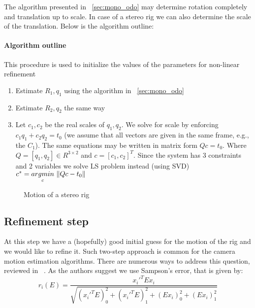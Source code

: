 \documentclass[10pt]{article}         %
\DeclarePairedDelimiter\norm{\lVert}{\rVert}%
\begin{document}
The algorithm presented in ~\ref{sec:mono_odo} may determine
rotation completely and translation up to scale.  In case of a stereo
rig we can also determine the scale of the translation.  Below is the
algorithm outline:

\paragraph{Algorithm outline} This procedure is used to initialize the
values of the parameters for non-linear refinement
\begin{enumerate}
\item Estimate $R_1,q_1$ using the algorithm in ~\ref{sec:mono_odo}
\item Estimate $R_2,q_2$ the same way
\item Let $c_1,c_2$ be the real scales of $q_1,q_2$. We solve for
  scale by enforcing $c_1q_1+c_2q_2 = t_0$ (we assume that all vectors
  are given in the same frame, e.g., the $C_1$).  The same equations
  may be written in matrix form $Qc=t_0$.  Where $Q = [q_1, q_2] \in
  R^{3\times2}$ and $c=[c_1,c_2]^T$.  Since the system has 3
  constraints and 2 variables we solve LS problem instead (using SVD)
  $c^* = \underset{c}{argmin}\ \norm{Qc-t_0}$
\end{enumerate}

\begin{figure}[!h]
  \centering
  \caption{Motion of a stereo rig}
  \label{fig:stereo_rig}
\end{figure}


\subsection{Refinement step}

At this step we have a (hopefully) good initial guess for the motion
of the rig and we would like to refine it. Such two-step approach is
common for the camera motion estimation algorithms.  There are
numerous ways to address this question, reviewed in
~\cite{Botterill-etal-2011c}.  As the authors suggest we use Sampson's
error, that is given by:
\[
r_i(E) = \frac{x_i'^TEx_i}{\sqrt{(x_i'^TE)^2_0+(x_i'^TE)^2_1+(Ex_i)^2_0+(Ex_i)^2_1}}
\]
\end{document}
